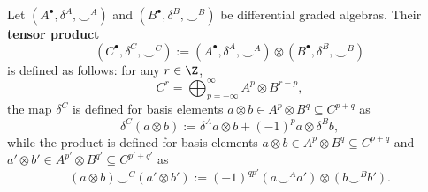 \begin{definition}
  \label{idec/differential_graded_algebra/tensor_product-definition}
  Let $(A^\bullet, \delta^A, \smile^A)$ and $(B^\bullet, \delta^B, \smile^B)$ be
  differential graded algebras.
  Their \textbf{tensor product}
  \begin{equation}
    (C^\bullet, \delta^C, \smile^C)
    := (A^\bullet, \delta^A, \smile^A) \otimes (B^\bullet, \delta^B, \smile^B)
  \end{equation}
  is defined as follows: for any $r \in \Z$,
  \begin{equation}
    C^r = \bigoplus_{p = -\infty}^\infty A^p \otimes B^{r - p},
  \end{equation}
  the map $\delta^C$ is defined for basis elements
  $a \otimes b \in A^p \otimes B^q \subseteq C^{p + q}$ as
  \begin{equation}
    \delta^C(a \otimes b)
    := \delta^A a \otimes b + (-1)^p a \otimes \delta^B b,
  \end{equation}
  while the product is defined for basis elements
  $a \otimes b \in A^p \otimes B^q \subseteq C^{p + q}$ and
  $a' \otimes b' \in A^{p'} \otimes B^{q'} \subseteq C^{p' + q'}$
  as
  \begin{equation}
    (a \otimes b) \smile^C (a' \otimes b')
    := (-1)^{q p'} (a \smile^A a') \otimes (b \smile^B b').
  \end{equation}
\end{definition}
